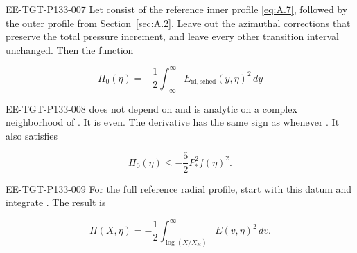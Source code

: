 \begin{lemma}\label{lem:A.5}
\begin{EESegment}{EE-TGT-P133-007}
Let  consist of the reference inner profile \eqref{eq:A.7}, followed by the
outer profile  from Section~\ref{sec:A.2}. Leave out the azimuthal corrections that preserve
the total pressure increment, and leave every other transition interval unchanged. Then the function
\end{EESegment}
\begin{equation}
 \Pi_0(\eta)=-\frac12\int_{-\infty}^{\infty}
 E_{\mathrm{id,sched}}(y,\eta)^2\,dy
 \tag{A.21}\label{eq:A.21}
\end{equation}
\begin{EESegment}{EE-TGT-P133-008}
does not depend on  and is analytic on a complex neighborhood of
. It is even. The derivative  has the same sign as
 whenever . It also satisfies
\end{EESegment}
\begin{equation}
 \Pi_0(\eta)\leq-\frac52P_*^2f(\eta)^2.
 \tag{A.22}\label{eq:A.22}
\end{equation}
\begin{EESegment}{EE-TGT-P133-009}
For the full reference radial profile, start with this datum and integrate
. The result is
\end{EESegment}
\begin{equation}
 \Pi(X,\eta)=-\frac12\int_{\log(X/X_R)}^\infty E(v,\eta)^2\,dv.
 \tag{A.23}\label{eq:A.23}
\end{equation}
\end{lemma}
